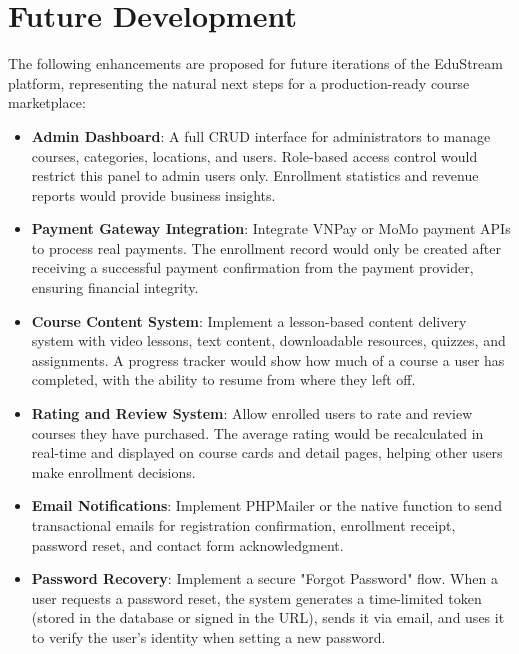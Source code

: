 \documentclass[12pt,a4paper]{report}
\begin{document}
\section{Future Development}

The following enhancements are proposed for future iterations of the EduStream platform, representing the natural next steps for a production-ready course marketplace:

\begin{itemize}
    \item \textbf{Admin Dashboard}: A full CRUD interface for administrators to manage courses, categories, locations, and users. Role-based access control would restrict this panel to admin users only. Enrollment statistics and revenue reports would provide business insights.
    
    \item \textbf{Payment Gateway Integration}: Integrate VNPay or MoMo payment APIs to process real payments. The enrollment record would only be created after receiving a successful payment confirmation from the payment provider, ensuring financial integrity.
    
    \item \textbf{Course Content System}: Implement a lesson-based content delivery system with video lessons, text content, downloadable resources, quizzes, and assignments. A progress tracker would show how much of a course a user has completed, with the ability to resume from where they left off.
    
    \item \textbf{Rating and Review System}: Allow enrolled users to rate and review courses they have purchased. The average rating would be recalculated in real-time and displayed on course cards and detail pages, helping other users make enrollment decisions.
    
    \item \textbf{Email Notifications}: Implement PHPMailer or the native  function to send transactional emails for registration confirmation, enrollment receipt, password reset, and contact form acknowledgment.
    
    \item \textbf{Password Recovery}: Implement a secure "Forgot Password" flow. When a user requests a password reset, the system generates a time-limited token (stored in the database or signed in the URL), sends it via email, and uses it to verify the user's identity when setting a new password.
    

\end{itemize}
\end{document}
